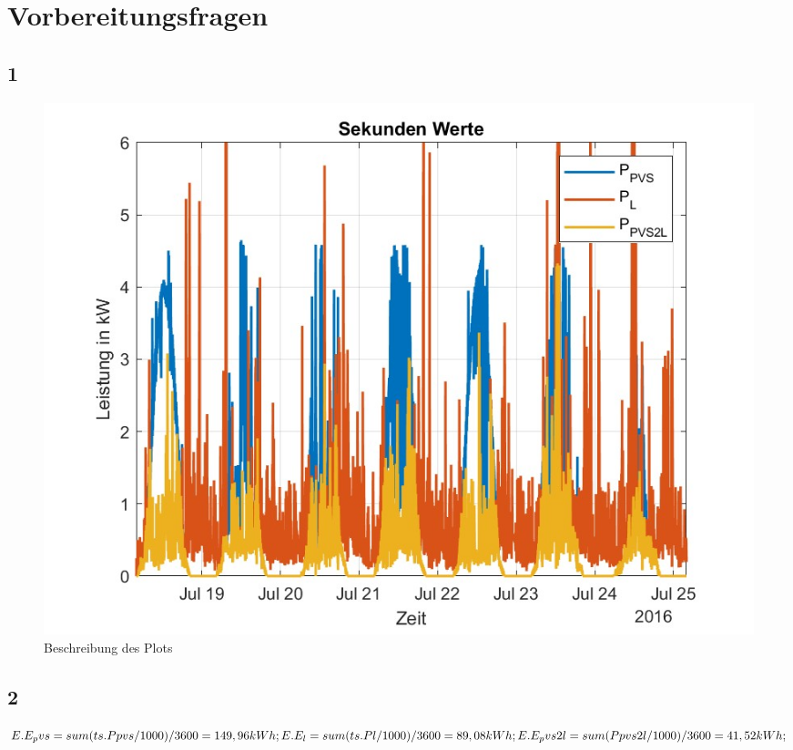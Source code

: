 \newpage
\section{Vorbereitungsfragen}
\subsection{1}
\begin{figure}[H]
    \centering
    \includegraphics[width=\textwidth]{Abbildungen/plot.jpg}
    \caption{Beschreibung des Plots}
    \label{fig:plot3062023}
\end{figure}
\subsection{2}
$E.E_pvs = sum(ts.Ppvs/1000)/3600=149,96kWh;\\
E.E_l = sum(ts.Pl/1000)/3600=89,08kWh;\\
E.E_pvs2l = sum(Ppvs2l/1000)/3600=41,52kWh;$\\

